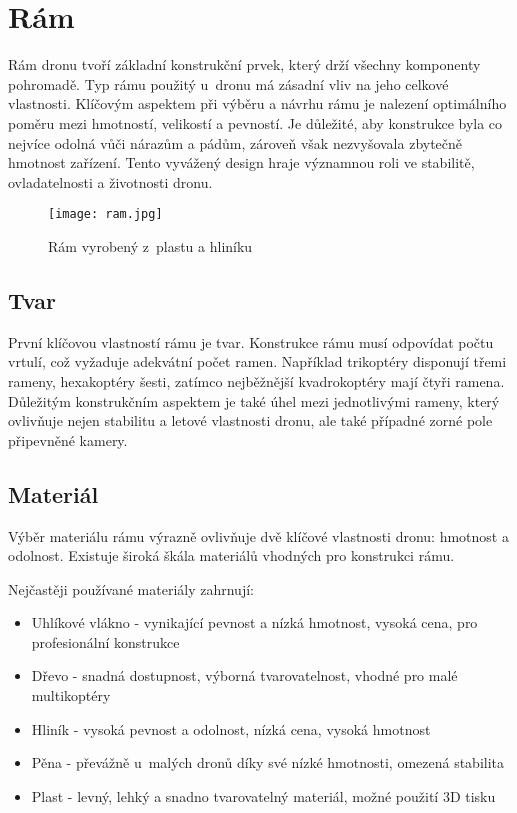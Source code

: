 \documentclass[12pt]{report}
\begin{document}
\section[Rám]{Rám}
Rám dronu tvoří základní konstrukční prvek, který drží všechny komponenty pohromadě. Typ rámu použitý u~dronu má zásadní vliv na jeho celkové vlastnosti. Klíčovým aspektem při výběru a návrhu rámu je nalezení optimálního poměru mezi hmotností, velikostí a pevností. Je důležité, aby konstrukce byla co nejvíce odolná vůči nárazům a pádům, zároveň však nezvyšovala zbytečně hmotnost zařízení. Tento vyvážený design hraje významnou roli ve stabilitě, ovladatelnosti a životnosti dronu.

\begin{figure}[H]
	\centering
	\texttt{[image: ram.jpg]}
	\caption{Rám vyrobený z~plastu a hliníku \cite{mainbook}}
	\label{fig:ram.jpg}
  \end{figure}

\subsection[Tvar]{Tvar}
První klíčovou vlastností rámu je tvar. Konstrukce rámu musí odpovídat počtu vrtulí, což vyžaduje adekvátní počet ramen. Například trikoptéry disponují třemi rameny, hexakoptéry šesti, zatímco nejběžnější kvadrokoptéry mají čtyři ramena. Důležitým konstrukčním aspektem je také úhel mezi jednotlivými rameny, který ovlivňuje nejen stabilitu a letové vlastnosti dronu, ale také případné zorné pole připevněné kamery.

\subsection[Materiál]{Materiál}
Výběr materiálu rámu výrazně ovlivňuje dvě klíčové vlastnosti dronu: hmotnost a odolnost. Existuje široká škála materiálů vhodných pro konstrukci rámu.

Nejčastěji používané materiály zahrnují:
\begin{itemize}
	\item Uhlíkové vlákno - vynikající pevnost a nízká hmotnost, vysoká cena, pro profesionální konstrukce
	\item Dřevo - snadná dostupnost, výborná tvarovatelnost, vhodné pro malé multikoptéry
	\item Hliník - vysoká pevnost a odolnost, nízká cena, vysoká hmotnost
	\item Pěna - převážně u~malých dronů díky své nízké hmotnosti, omezená stabilita
	\item Plast - levný, lehký a snadno tvarovatelný materiál, možné použití 3D tisku
\end{itemize}
\end{document}
